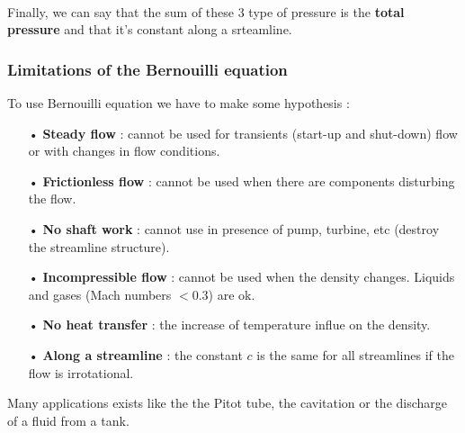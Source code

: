 		\ \\ Finally, we can say that the sum of these 3 type of pressure is the \textbf{total pressure} and that it's constant along a srteamline. 

		\subsubsection{Limitations of the Bernouilli equation}
			To use Bernouilli equation we have to make some hypothesis : 
			\begin{itemize}
				\item[•] \textbf{Steady flow} : cannot be used for transients (start-up and shut-down) flow or with changes in flow conditions. 
				\item[•] \textbf{Frictionless flow} : cannot be used when there are components disturbing the flow.
				\item[•] \textbf{No shaft work} : cannot use in presence of pump, turbine, etc (destroy the streamline structure).
				\item[•] \textbf{Incompressible flow} : cannot be used when the density changes. Liquids and gases (Mach numbers $<0.3$) are ok.
				\item[•] \textbf{No heat transfer} : the increase of temperature influe on the density.
				\item[•] \textbf{Along a streamline} : the constant $c$ is the same for all streamlines if the flow is irrotational.
			\end{itemize}				
			Many applications exists like the the Pitot tube, the cavitation or the discharge of a fluid from a tank. 
			
